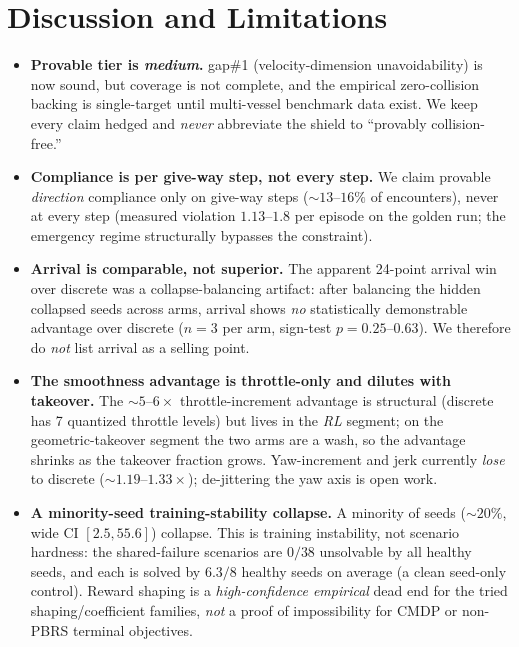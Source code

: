 \documentclass[12pt,letterpaper]{article}
\theoremstyle{remark}\newtheorem*{scope}{Scope and honest limits}
\begin{document}
\section{Discussion and Limitations}
\begin{itemize}
  \item \textbf{Provable tier is \emph{medium}.} gap\#1 (velocity-dimension
  unavoidability) is now sound, but coverage is not complete, and the empirical
  zero-collision backing is single-target until multi-vessel benchmark data exist.
  We keep every claim hedged and \emph{never} abbreviate the shield to ``provably
  collision-free.''

  \item \textbf{Compliance is per give-way step, not every step.} We claim provable
  \emph{direction} compliance only on give-way steps ($\sim\!13$--$16\%$ of
  encounters), never at every step (measured violation $1.13$--$1.8$ per episode on
  the golden run; the emergency regime structurally bypasses the constraint).

  \item \textbf{Arrival is comparable, not superior.} The apparent 24-point
  arrival win over discrete was a collapse-balancing artifact: after balancing the
  hidden collapsed seeds across arms, arrival shows \emph{no} statistically
  demonstrable advantage over discrete ($n=3$ per arm, sign-test $p=0.25$--$0.63$).
  We therefore do \emph{not} list arrival as a selling point.

  \item \textbf{The smoothness advantage is throttle-only and dilutes with
  takeover.} The $\sim\!5$--$6\times$ throttle-increment advantage is structural
  (discrete has 7 quantized throttle levels) but lives in the \emph{RL} segment; on
  the geometric-takeover segment the two arms are a wash, so the advantage shrinks
  as the takeover fraction grows. Yaw-increment and jerk currently \emph{lose} to
  discrete ($\sim\!1.19$--$1.33\times$); de-jittering the yaw axis is open work.

  \item \textbf{A minority-seed training-stability collapse.} A minority of seeds
  ($\sim\!20\%$, wide CI $[2.5,55.6]$) collapse. This is training instability, not
  scenario hardness: the shared-failure scenarios are $0/38$ unsolvable by all
  healthy seeds, and each is solved by $6.3/8$ healthy seeds on average (a clean
  seed-only control). Reward shaping is a \emph{high-confidence empirical} dead end
  for the tried shaping/coefficient families, \emph{not} a proof of impossibility
  for CMDP or non-PBRS terminal objectives.


\end{itemize}
\end{document}
